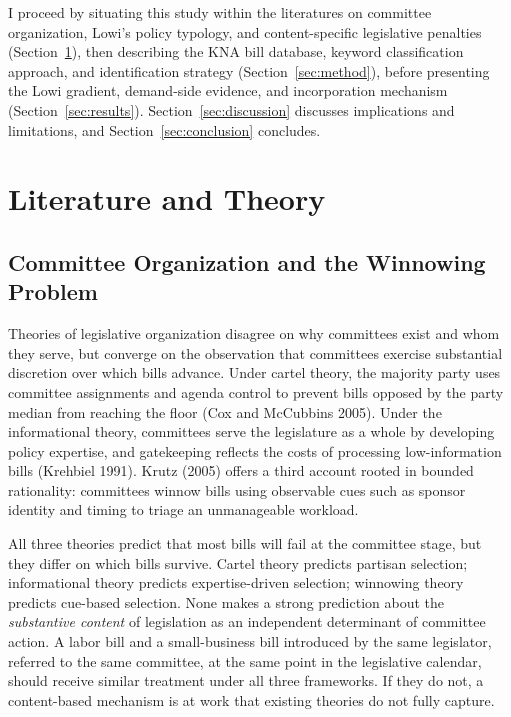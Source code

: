 \documentclass[11pt]{article}
\begin{document}
I proceed by situating this study within the literatures on committee organization, Lowi's policy typology, and content-specific legislative penalties (Section~\ref{sec:lit}), then describing the KNA bill database, keyword classification approach, and identification strategy (Section~\ref{sec:method}), before presenting the Lowi gradient, demand-side evidence, and incorporation mechanism (Section~\ref{sec:results}). Section~\ref{sec:discussion} discusses implications and limitations, and Section~\ref{sec:conclusion} concludes.


\section{Literature and Theory}
\label{sec:lit}

\subsection{Committee Organization and the Winnowing Problem}

Theories of legislative organization disagree on why committees exist and whom they serve, but converge on the observation that committees exercise substantial discretion over which bills advance. Under cartel theory, the majority party uses committee assignments and agenda control to prevent bills opposed by the party median from reaching the floor (Cox and McCubbins 2005). Under the informational theory, committees serve the legislature as a whole by developing policy expertise, and gatekeeping reflects the costs of processing low-information bills (Krehbiel 1991). Krutz (2005) offers a third account rooted in bounded rationality: committees winnow bills using observable cues such as sponsor identity and timing to triage an unmanageable workload.

All three theories predict that most bills will fail at the committee stage, but they differ on which bills survive. Cartel theory predicts partisan selection; informational theory predicts expertise-driven selection; winnowing theory predicts cue-based selection. None makes a strong prediction about the \emph{substantive content} of legislation as an independent determinant of committee action. A labor bill and a small-business bill introduced by the same legislator, referred to the same committee, at the same point in the legislative calendar, should receive similar treatment under all three frameworks. If they do not, a content-based mechanism is at work that existing theories do not fully capture.
\end{document}
